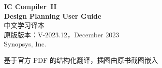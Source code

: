 \documentclass[UTF8,a4paper,openany,oneside]{ctexbook}
\begin{document}
\begin{titlepage}
  \centering
  \vspace*{2cm}
  {\Huge\bfseries IC Compiler\texttrademark\ II}\\[0.6em]
  {\Huge\bfseries Design Planning User Guide}\\[1.2em]
  {\LARGE 中文学习译本}\\[2em]
  {\large 原版版本：V-2023.12，December 2023}\\[0.5em]
  {\large Synopsys, Inc.}\\[3em]
  \begin{minipage}{0.85\textwidth}
    \copyrightnotice
  \end{minipage}
  \vfill
  {\large 基于官方 PDF 的结构化翻译，插图由原书截图嵌入}
\end{titlepage}

\frontmatter
\tableofcontents
\clearpage


\mainmatter














\end{document}
